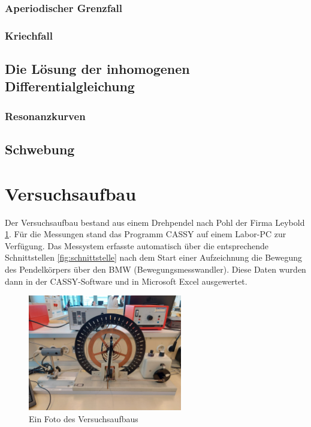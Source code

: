 \documentclass{article}
\begin{document}
\subsubsection{Aperiodischer Grenzfall}
\subsubsection{Kriechfall}
\subsection{Die Lösung der inhomogenen Differentialgleichung}
\subsubsection{Resonanzkurven}
\subsection{Schwebung}
\clearpage

\section{Versuchsaufbau}
Der Versuchsaufbau bestand aus einem Drehpendel nach Pohl der Firma Leybold \ref{fig:versuchsaufbau}.
Für die Messungen stand das Programm CASSY auf einem Labor-PC zur Verfügung.
Das Messystem erfasste automatisch über die entsprechende Schnittstellen \ref{fig:schnittstelle}
nach dem Start einer Aufzeichnung die Bewegung des Pendelkörpers
über den BMW (Bewegungsmesswandler). Diese Daten wurden dann in der CASSY-Software
und in Microsoft Excel ausgewertet.

\begin{figure}[H]
    \centering
    \includegraphics[width=0.6\textwidth]{bilder/drehpendel.jpg}
    \caption{Ein Foto des Versuchsaufbaus}
    \label{fig:versuchsaufbau}
\end{figure}
\end{document}
